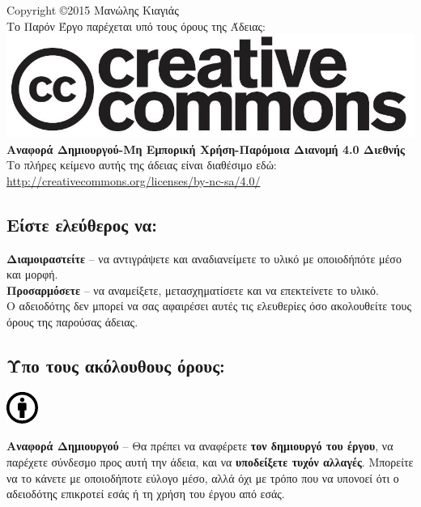 %
%
\begin{center}
Copyright \copyright 2015 Μανώλης Κιαγιάς\\
Το Παρόν Έργο παρέχεται υπό τους όρους της Άδειας:\\
\includegraphics[scale=0.2]{images/license/cc-logo}\\
\textbf{Αναφορά Δημιουργού-Μη Εμπορική Χρήση-Παρόμοια Διανομή 4.0 Διεθνής}\\
Το πλήρες κείμενο αυτής της άδειας είναι διαθέσιμο εδώ:\\
\url{http://creativecommons.org/licenses/by-nc-sa/4.0/}
\end{center}
\subsection*{Είστε ελεύθερος να:}
\noindent
\textbf{Διαμοιραστείτε} -- να αντιγράψετε και αναδιανείμετε το υλικό με οποιοδήπότε μέσο και μορφή.\\
\textbf{Προσαρμόσετε} -- να αναμείξετε, μετασχηματίσετε και να επεκτείνετε το υλικό.\\

Ο αδειοδότης δεν μπορεί να σας αφαιρέσει αυτές τις ελευθερίες όσο ακολουθείτε τους όρους της παρούσας άδειας.
\subsection*{Ύπο τους ακόλουθους όρους:}

\vspace{1em}
\noindent
\parbox{1.5cm}{\includegraphics[scale=0.15]{images/license/cc_by_30}}
\parbox{10.5cm}{\textbf{Αναφορά Δημιουργού} -- Θα πρέπει να αναφέρετε \textbf{τον δημιουργό του έργου}, να παρέχετε σύνδεσμο προς αυτή την άδεια, και να \textbf{υποδείξετε τυχόν αλλαγές}. Μπορείτε να το κάνετε με οποιοδήποτε εύλογο μέσο, αλλά όχι με τρόπο που να υπονοεί ότι ο αδειοδότης επικροτεί εσάς ή τη χρήση του έργου από εσάς.}

